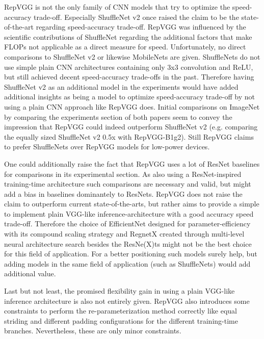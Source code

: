 RepVGG is not the only family of CNN models that try to optimize the speed-accuracy trade-off. Especially ShuffleNet v2 once raised the claim to be the state-of-the-art regarding speed-accuracy trade-off. RepVGG was influenced by the scientific contributions of ShuffleNet regarding the additional factors that make FLOPs not applicable as a direct measure for speed. Unfortunately, no direct comparisons to ShuffleNet v2 or likewise MobileNets are given. ShuffleNets do not use simple plain CNN architectures containing only 3x3 convolution and ReLU, but still achieved decent speed-accuracy trade-offs in the past. Therefore having ShuffleNet v2 as an additional model in the experiments would have added additional insights as being a model to optimize speed-accuracy trade-off by not using a plain CNN approach like RepVGG does. Initial comparisons on ImageNet by comparing the experiments section of both papers seem to convey the impression that RepVGG could indeed outperform ShuffleNet v2 (e.g. comparing the equally sized ShuffleNet v2 0.5x with RepVGG-B1g2). Still RepVGG claims to prefer ShuffleNets over RepVGG models for low-power devices. 

One could additionally raise the fact that RepVGG uses a lot of ResNet baselines for comparisons in its experimental section. As also using a ResNet-inspired training-time architecture such comparisons are necessary and valid, but might add a bias in baselines dominantely to ResNets. RepVGG does not raise the claim to outperform current state-of-the-arts, but rather aims to provide a simple to implement plain VGG-like inference-architecture with a good accuracy speed trade-off. Therefore the choice of EfficientNet designed for parameter-efficiency with its compound scaling strategy and RegnetX created through multi-level neural architecture search besides the ResNe(X)ts might not be the best choice for this field of application. For a better positioning such models surely help, but adding models in the same field of application (such as ShuffleNets) would add additional value.

Last but not least, the promised flexibility gain in using a plain VGG-like inference architecture is also not entirely given. RepVGG also introduces some constraints to perform the re-parameterization method correctly like equal striding and different padding configurations for the different training-time branches. Nevertheless, these are only minor constraints. 
